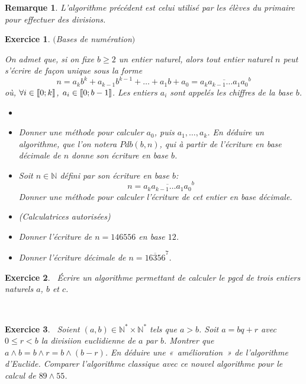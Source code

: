 \documentclass[11pt,a4paper]{article}
\newtheorem{ex}{Exercice}
\newtheorem*{remarque}{Remarque}
\newcommand{\N}{\mathbb{N}}
\begin{document}
\begin{remarque}
 L'algorithme précédent est celui utilisé par les élèves du primaire pour effectuer des divisions.%
\end{remarque}


\begin{ex}\label{exBases de numération}$($Bases de numération$)$

On admet que, si on fixe $b\geqslant 2$ un entier naturel, alors tout entier naturel $n$ peut s'écrire de façon unique sous la forme
$$ n=a_k b^k +a_{k-1}b^{k-1}+ \ldots + a_1 b +a_0= \overline{a_k a_{k-1}\ldots a_1 a_0}^b  $$
où, $ \forall i \in \llbracket 0; k \rrbracket $, $a_i \in \llbracket 0; b-1 \rrbracket$. Les entiers $a_i$ sont appelés les chiffres de la base $b$.
\begin{itemize}
\item[\textbf{Algorithmes}] 
\item[$1.$] Donner une méthode pour calculer $a_0$, puis $a_1, \ldots, a_k$.  En déduire un algorithme, que l'on notera $Pdb(b,n)$, qui à partir de l'écriture en base décimale de $n$ donne son écriture en base $b$. 
\item[$2.$] Soit $n \in \mathbb{N}$ défini par son écriture en base $b$:
$$ n=\overline{a_k a_{k-1}\ldots a_1 a_0}^b  $$
Donner une méthode pour calculer l'écriture de cet entier en base décimale. 
\item[\textbf{Applications}](Calculatrices autorisées)
\item[$3.$] Donner l'écriture de $n=146556$ en base $12$.
\item[$4.$] Donner l'écriture décimale de $n=\overline{16356}^7$.
\end{itemize}

\end{ex}





\begin{ex}\
Écrire un algorithme permettant de calculer le pgcd de trois entiers naturels $a$, $b$ et $c$.
\end{ex}



\

\begin{ex}\label{exOptimisation_algo_Euclide}\
Soient $(a,b)\in \N^*\times \N^*$ tels que $a>b$. Soit  $a=bq+r$ avec $0 \leq  r <b$ la divisiion euclidienne de $a$ par $b$. Montrer que $a\wedge b=b\wedge r=b\wedge (b-r)$. En déduire une «~amélioration~» de l'algorithme d'Euclide. Comparer l'algorithme classique avec ce nouvel algorithme pour le calcul de $89\wedge 55$.
\end{ex}
\end{document}
